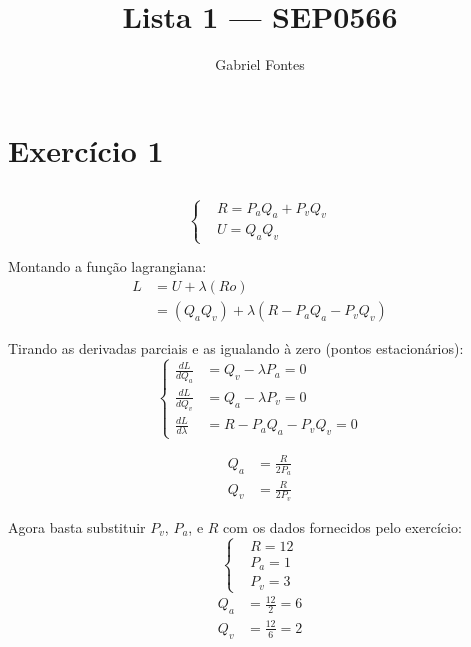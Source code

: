 \documentclass{article}
\title{Lista 1 --- SEP0566}
\author{Gabriel Fontes}
\begin{document}
\maketitle

\section{Exercício 1}
\subsection{}
\subsection{}
\subsection{}

\[
	\left\{
	\begin{aligned}
		 & R = P_a Q_a + P_v Q_v \\
		 & U = Q_a Q_v
	\end{aligned}
	\right.
\]

Montando a função lagrangiana:
\[
	\begin{aligned}
		L & = U + \lambda(Ro)                            \\
		  & = (Q_a Q_v) + \lambda(R - P_a Q_a - P_v Q_v)
	\end{aligned}
\]

Tirando as derivadas parciais e as igualando à zero (pontos estacionários):
\[
	\left\{
	\begin{aligned}
		\frac{dL}{dQ_a}     & = Q_v - \lambda P_a = 0     \\
		\frac{dL}{dQ_v}     & = Q_a - \lambda P_v = 0     \\
		\frac{dL}{d\lambda} & = R - P_a Q_a - P_v Q_v = 0
	\end{aligned}
	\right.
\]

\[
	\begin{aligned}
		Q_a & = \frac{R}{2P_a} \\
		Q_v & = \frac{R}{2P_v}
	\end{aligned}
\]

Agora basta substituir \(P_v\), \(P_a\), e \(R\) com os dados fornecidos pelo exercício:
\[
	\left\{
	\begin{aligned}
		 & R = 12  \\
		 & P_a = 1 \\
		 & P_v = 3
	\end{aligned}
	\right.
\]
\[
	\begin{aligned}
		Q_a & = \frac{12}{2} = 6 \\
		Q_v & = \frac{12}{6} = 2
	\end{aligned}
\]
\end{document}
